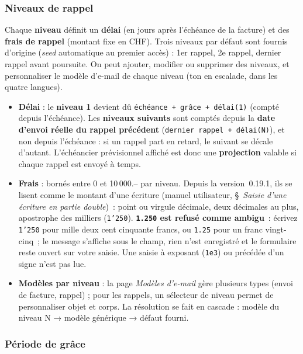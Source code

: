 \documentclass[a4paper,11pt,oneside]{article}
\begin{document}
\subsubsection{Niveaux de rappel}

Chaque \textbf{niveau} définit un \textbf{délai} (en jours après l'échéance de la facture) et des \textbf{frais de rappel} (montant fixe en CHF). Trois niveaux par défaut sont fournis d'origine (\emph{seed} automatique au premier accès) : 1er rappel, 2e rappel, dernier rappel avant poursuite. On peut ajouter, modifier ou supprimer des niveaux, et personnaliser le modèle d'e-mail de chaque niveau (ton en escalade, dans les quatre langues).

\begin{itemize}
    \item \textbf{Délai} : le \textbf{niveau 1} devient dû \texttt{échéance + grâce + délai(1)} (compté depuis l'échéance). Les \textbf{niveaux suivants} sont comptés depuis la \textbf{date d'envoi réelle du rappel précédent} (\texttt{dernier rappel + délai(N)}), et non depuis l'échéance : si un rappel part en retard, le suivant se décale d'autant. L'échéancier prévisionnel affiché est donc une \textbf{projection} valable si chaque rappel est envoyé à temps.
    \item \textbf{Frais} : bornés entre 0 et 10\,000.– par niveau. Depuis la version~0.19.1, ils se lisent comme le montant d'une écriture (manuel utilisateur, \S~\emph{Saisie d'une écriture en partie double})~: point ou virgule décimale, deux décimales au plus, apostrophe des milliers (\texttt{1'250}). \textbf{\texttt{1.250} est refusé comme ambigu}~: écrivez \texttt{1'250} pour mille deux cent cinquante francs, ou \texttt{1.25} pour un franc vingt-cinq~; le message s'affiche sous le champ, rien n'est enregistré et le formulaire reste ouvert sur votre saisie. Une saisie à exposant (\texttt{1e3}) ou précédée d'un signe n'est pas lue.
    \item \textbf{Modèles par niveau} : la page \emph{Modèles d'e-mail} gère plusieurs types (envoi de facture, rappel) ; pour les rappels, un sélecteur de niveau permet de personnaliser objet et corps. La résolution se fait en cascade : modèle du niveau N → modèle générique → défaut fourni.
\end{itemize}

\subsubsection{Période de grâce}
\end{document}
